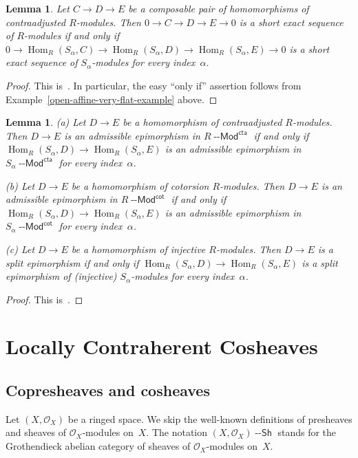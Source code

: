 \documentclass[12pt,a4paper]{amsart}
\newcommand{\+}{\nobreakdash-}
\renewcommand{\:}{\colon}
\newcommand{\rarrow}{\longrightarrow}
\DeclareMathOperator{\Hom}{Hom}
\newcommand{\Modl}{{\operatorname{\mathsf{--Mod}}}}
\newcommand{\Sh}{{\operatorname{\mathsf{--Sh}}}}
\renewcommand{\cot}{\mathsf{cot}}
\newcommand{\cta}{\mathsf{cta}}
\newcommand{\cO}{\mathcal O}
\newcommand{\Section}[1]{\bigskip\section{#1}\medskip}
\theoremstyle{plain}
\newtheorem{lem}[thm]{Lemma}
\theoremstyle{definition}
\begin{document}
\begin{lem} \label{short-exact-sequnces-of-cta-are-colocal}
 Let $C\rarrow D\rarrow E$ be a composable pair of homomorphisms of
contraadjusted $R$\+modules.
 Then\/ $0\rarrow C\rarrow D\rarrow E\rarrow0$ is a short exact
sequence of $R$\+modules if and only if\/ $0\rarrow\Hom_R(S_\alpha,C)
\rarrow\Hom_R(S_\alpha,D)\rarrow\Hom_R(S_\alpha,E)\rarrow0$ is a short
exact sequence of $S_\alpha$\+modules for every index\/~$\alpha$.
\end{lem}

\begin{proof}
 This is~\cite[Lemma~1.4.1(a)]{Pcosh}.
 In particular, the easy ``only if'' assertion follows from
Example~\ref{open-affine-very-flat-example} above.
\end{proof}

\begin{lem} \label{colocality-of-epimorphisms}
\textup{(a)} Let $D\rarrow E$ be a homomorphism of contraadjusted
$R$\+modules.
 Then $D\rarrow E$ is an admissible epimorphism in $R\Modl^\cta$ if
and only if\/ $\Hom_R(S_\alpha,D)\rarrow\Hom_R(S_\alpha,E)$ is
an admissible epimorphism in $S_\alpha\Modl^\cta$ for every
index\/~$\alpha$. {\par}
\textup{(b)} Let $D\rarrow E$ be a homomorphism of cotorsion
$R$\+modules.
 Then $D\rarrow E$ is an admissible epimorphism in $R\Modl^\cot$ if
and only if\/ $\Hom_R(S_\alpha,D)\rarrow\Hom_R(S_\alpha,E)$ is
an admissible epimorphism in $S_\alpha\Modl^\cot$ for every
index\/~$\alpha$. \par
\textup{(c)} Let $D\rarrow E$ be a homomorphism of injective
$R$\+modules.
 Then $D\rarrow E$ is a split epimorphism if and only if\/
$\Hom_R(S_\alpha,D)\rarrow\Hom_R(S_\alpha,E)$ is a split
epimorphism of (injective) $S_\alpha$\+modules for every
index\/~$\alpha$.
\end{lem}

\begin{proof}
 This is~\cite[Lemmas~1.4.1(b), 1.4.2(b), and~1.4.3(b)]{Pcosh}.
\end{proof}


\Section{Locally Contraherent Cosheaves}

\subsection{Copresheaves and cosheaves}
 Let $(X,\cO_X)$ be a ringed space.
 We skip the well-known definitions of presheaves and sheaves of
$\cO_X$\+modules on~$X$.
 The notation $(X,\cO_X)\Sh$ stands for the Grothendieck abelian
category of sheaves of $\cO_X$\+modules on~$X$.
\end{document}
